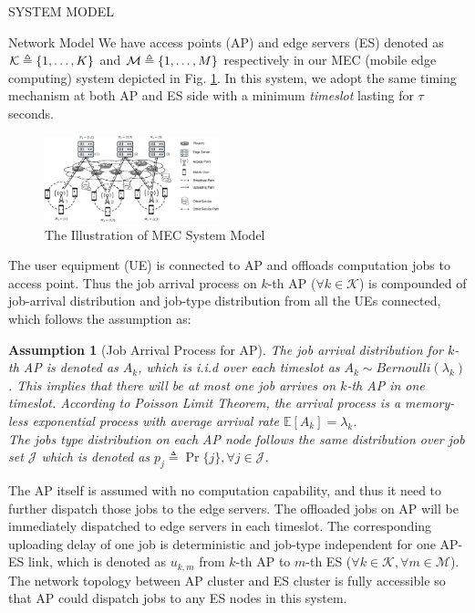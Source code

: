 \documentclass[10pt, conference, letterpaper]{IEEEtran}
\newtheorem{assumption}{Assumption}
\newcommand{\define}{\triangleq}
\DeclarePairedDelimiter{\set}{\{}{\}}
\newcommand{\apSet}{\mathcal{K}}
\newcommand{\esSet}{\mathcal{M}}
\newcommand{\jSpace}{\mathcal{J}}
\begin{document}
    \begin{section}{SYSTEM MODEL}
        \label{sec:model}
        \begin{subsection}{Network Model}
            We have access points (AP) and edge servers (ES) denoted as $\apSet \define \set{1,\dots,K}$ and $\mathcal{M} \define \set{1,\dots,M}$ respectively in our MEC (mobile edge computing) system depicted in Fig. \ref{fig:system}. In this system, we adopt the same timing mechanism at both AP and ES side with a minimum \emph{timeslot} lasting for $\tau$ seconds.

            \begin{figure}[ht]
                \centering
                \includegraphics[width=0.45\textwidth, trim={0.5cm 0.5cm 0.5cm 0.5cm}, clip]{system-model.pdf}
                \caption{The Illustration of MEC System Model}
                \label{fig:system}
            \end{figure}

            The user equipment (UE) is connected to AP and offloads computation jobs to access point. Thus the job arrival process on $k$-th AP ($\forall k\in\apSet$) is compounded of job-arrival distribution and job-type distribution from all the UEs connected, which follows the assumption as:
            \begin{assumption}[Job Arrival Process for AP]
                The job arrival distribution for $k$-th AP is denoted as $A_k$, which is i.i.d over each timeslot as $A_k \sim Bernoulli(\lambda_k)$. This implies that there will be at most one job arrives on $k$-th AP in one timeslot. According to \emph{Poisson Limit Theorem}, the arrival process is a memory-less exponential process with average arrival rate $\mathbb{E}[A_k]=\lambda_k$.
                \\
                The jobs type distribution on each AP node follows the same distribution over job set $\jSpace$ which is denoted as $p_j \define \Pr\{j\}, \forall j\in\jSpace$.
            \end{assumption}

            The AP itself is assumed with no computation capability, and thus it need to further dispatch those jobs to the edge servers.
            The offloaded jobs on AP will be immediately dispatched to edge servers in each timeslot. The corresponding uploading delay of one job is deterministic and job-type independent for one AP-ES link, which is denoted as $u_{k,m}$ from $k$-th AP to $m$-th ES ($\forall k\in\apSet, \forall m\in\esSet$).
            The network topology between AP cluster and ES cluster is fully accessible so that AP could dispatch jobs to any ES nodes in this system.


\end{subsection}
\end{section}
\end{document}

